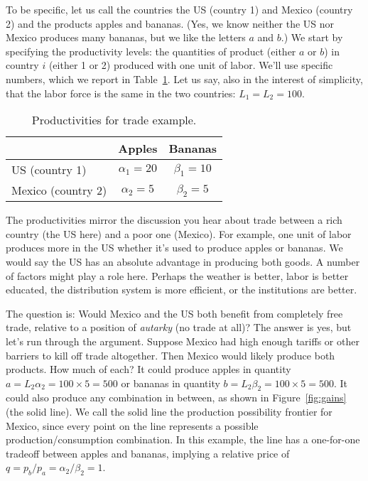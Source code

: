 To be specific, let us call the countries the US (country 1) and
Mexico (country 2) and the products apples and bananas.  (Yes, we
know neither the US nor Mexico produces many bananas, but we like
the letters $a$ and $b$.)  We start by specifying the productivity
levels: the quantities of product (either $a$ or $b$) in country
$i$ (either 1 or 2) produced with one unit of labor.
We'll use specific numbers, which we report in Table~\ref{tab:prod}.
Let us say, also in the interest of simplicity,
that the labor force is the same in the two countries: $L_{1}=L_{2}=100$.

\begin{table}[ht]
\centering
\caption{Productivities for trade example.}
\begin{tabular}{lcc}
\toprule
                    &        Apples       &      Bananas    \\%

\midrule
US (country 1)      &   $\alpha_{1}=20$   & $\beta_{1}=10$  \\%
Mexico (country 2)  &   $\alpha_{2}=5$    & $\beta_{2}=5$   \\%
\bottomrule
\end{tabular}
\label{tab:prod}
\end{table}


The productivities mirror the discussion you hear about trade
between a rich country (the US here) and a poor one (Mexico).
For example, one unit of labor produces more in the US
whether it's used to produce apples or bananas.
We would say the US has an {absolute advantage} in producing both goods.
A number of factors might play a role here. Perhaps the weather is
better, labor is better educated, the distribution system is
more efficient, or the institutions are better.


The question is: Would Mexico and the US both benefit from
completely free trade, relative to a position of \textit{autarky}
(no trade at all)? The answer is yes, but let's run through
the argument. Suppose Mexico had high enough tariffs or other
barriers to kill off trade altogether. Then Mexico would likely
produce both products. How much of each? It could produce apples
in quantity $a=L_{2}\alpha_{2} = 100\times 5 = 500$ or bananas in
quantity $b=L_{2}\beta_{2} = 100\times 5 = 500$. It could also
produce any combination in between, as shown in
Figure~\ref{fig:gains} (the solid line). We call the solid line
the production possibility frontier for Mexico, since every point on the line
represents a possible production/consumption combination. In this example,
the line has a one-for-one tradeoff between apples and bananas,
implying a relative price of $ q=p_{b}/p_{a} =
\alpha_{2}/\beta_{2} = 1$.

